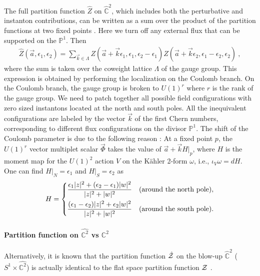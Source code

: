 \documentclass[letterpaper, 11pt]{article}
\def\IC{\mathbb{C}}
\def\IP{\mathbb{P}}
\def\CZ{{\cal Z}}
\def\e{\epsilon}
\begin{document}
The full partition function $\hat{Z}$ on $\hat{\IC}^2$, which includes both the perturbative and instanton contributions, can be written as a sum over the product of the partition functions at two fixed points \cite{Nekrasov:2003vi, Gottsche:2006bm, Gottsche:2006tn, Gasparim:2008ri, Bonelli:2012ny}. Here we turn off any external flux that can be supported on the $\IP^1$. Then 
\begin{align} \label{eq:blowup}
 \hat{Z}(\vec{a}, \e_1, \e_2) = \sum_{\vec{k} \in \Lambda} Z(\vec{a}+ \vec{k} \e_1, \e_1, \e_2 - \e_1) Z(\vec{a}+\vec{k} \e_2, \e_1 - \e_2, \e_2) \ , 
\end{align}
where the sum is taken over the coweight lattice $\Lambda$  of the gauge group.
This expression is obtained by performing the localization on the Coulomb branch. On the Coulomb branch, the gauge group is broken to $U(1)^r$ where $r$ is the rank of the gauge group. We need to patch together all possible field configurations with zero sized instantons located at the north and south poles.  All the inequivalent configurations are labeled by the vector $\vec{k}$ of the first Chern numbers, corresponding to different flux configurations on the divisor $\mathbb{P}^1$. The shift of the Coulomb parameter is due to the following reason \cite{Bershtein:2015xfa}: At a fixed point $p$, the $U(1)^r$ vector multiplet scalar $\vec{\Phi}$ takes the value of $\vec{a} + \vec{k}H|_p$, where $H$ is the moment map for the $U(1)^2$ action $V$ on the K\"ahler 2-form $\omega$, i.e., $\iota_V \omega = dH$. One can find $H|_{N} = \epsilon_1$ and $H|_{S} = \epsilon_2$ as 
\begin{align}
  \label{eq:moment-map}
  H = 
  \begin{dcases}
     \frac{\epsilon_1|z|^2+ (\epsilon_2 - \epsilon_1)|w|^2}{|z|^2+|w|^2} & \text{(around the north pole)},\\
   \frac{(\epsilon_1-\epsilon_2)|z|^2+ \epsilon_2|w|^2}{|z|^2+|w|^2} & \text{(around the south pole)}.
  \end{dcases}
\end{align}

\paragraph{Partition function on $\hat{\IC^2}$ vs $\IC^2$}
Alternatively, it is  known that the partition function $\hat{\CZ}$ on the blow-up $\hat{\IC}^2$ ($S^1 \times \hat{\IC^2}$) is actually identical to the flat space partition function $\CZ$  \cite{Nakajima:2003pg, Nakajima:2003uh,Nakajima:2005fg}.
 
\end{document}
